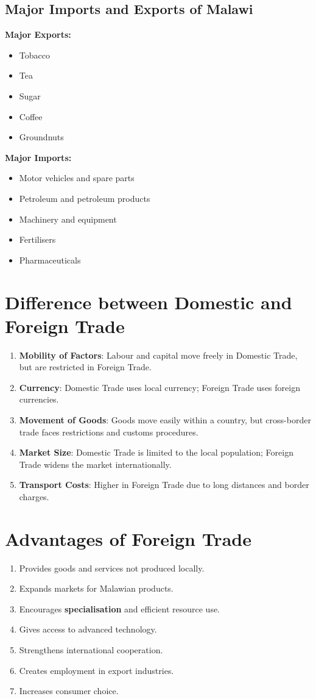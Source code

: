 \documentclass[12pt,a4paper, openany]{book}
\begin{document}
\subsection{Major Imports and Exports of Malawi}
\textbf{Major Exports:}
\begin{itemize}
	\item Tobacco
	\item Tea
	\item Sugar
	\item Coffee
	\item Groundnuts
\end{itemize}

\textbf{Major Imports:}
\begin{itemize}
	\item Motor vehicles and spare parts
	\item Petroleum and petroleum products
	\item Machinery and equipment
	\item Fertilisers
	\item Pharmaceuticals
\end{itemize}

\section{Difference between Domestic and Foreign Trade}
\begin{enumerate}
	\item \textbf{Mobility of Factors}: Labour and capital move freely in Domestic Trade, but are restricted in Foreign Trade.
	\item \textbf{Currency}: Domestic Trade uses local currency; Foreign Trade uses foreign currencies.
	\item \textbf{Movement of Goods}: Goods move easily within a country, but cross-border trade faces restrictions and customs procedures.
	\item \textbf{Market Size}: Domestic Trade is limited to the local population; Foreign Trade widens the market internationally.
	\item \textbf{Transport Costs}: Higher in Foreign Trade due to long distances and border charges.
\end{enumerate}

\section{Advantages of Foreign Trade}
\begin{enumerate}
	\item Provides goods and services not produced locally.
	\item Expands markets for Malawian products.
	\item Encourages \textbf{specialisation} and efficient resource use.
	\item Gives access to advanced technology.
	\item Strengthens international cooperation.
	\item Creates employment in export industries.
	\item Increases consumer choice.
\end{enumerate}
\end{document}
